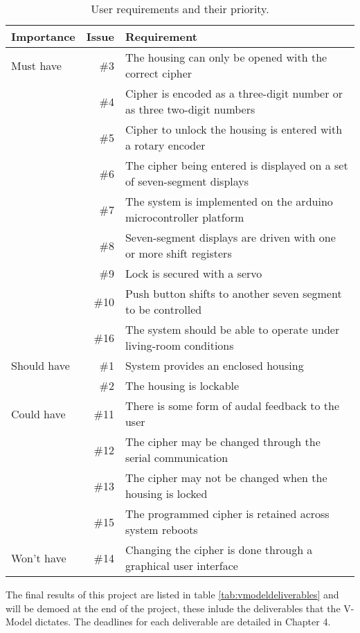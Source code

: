 \begin{table}
\centering
\begin{adjustwidth}{-1in}{1in}
\begin{tabular}{lrl}
\hline Importance & Issue & Requirement \\ \hline
\hline Must have
& \#3 & The housing can only be opened with the correct cipher \\
& \#4 & Cipher is encoded as a three-digit number or as three two-digit numbers \\
& \#5 & Cipher to unlock the housing is entered with a rotary encoder \\
& \#6 & The cipher being entered is displayed on a set of seven-segment displays \\
& \#7 & The system is implemented on the arduino microcontroller platform \\
& \#8 & Seven-segment displays are driven with one or more shift registers \\
& \#9 & Lock is secured with a servo \\
& \#10 & Push button shifts to another seven segment to be controlled \\
& \#16 & The system should be able to operate under living-room conditions \\
\hline Should have
& \#1 & System provides an enclosed housing \\
& \#2 & The housing is lockable \\
\hline Could have
& \#11 & There is some form of audal feedback to the user \\
& \#12 & The cipher may be changed through the serial communication \\
& \#13 & The cipher may not be changed when the housing is locked \\
& \#15 & The programmed cipher is retained across system reboots \\
\hline Won't have
& \#14 & Changing the cipher is done through a graphical user interface \\
\hline
\end{tabular}
\end{adjustwidth}
\caption{User requirements and their priority.}
\label{tab:userrequirements}
\end{table}

The final results of this project are listed in table \ref{tab:vmodeldeliverables} and will be demoed at the end of the project, these inlude the deliverables that the V-Model dictates. The deadlines for each deliverable are detailed in Chapter 4.

